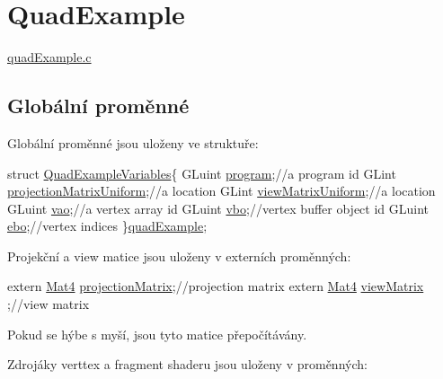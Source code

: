 \hypertarget{QuadExample-example}{\section{Quad\-Example}
}
\hyperlink{quadExample_8c}{quad\-Example.\-c}  \hypertarget{quadExample.c_Globals}{}\subsection{Globální proměnné}\label{quadExample.c_Globals}
Globální proměnné jsou uloženy ve struktuře\-: 
\begin{DoxyCodeInclude}

\textcolor{keyword}{struct }\hyperlink{structQuadExampleVariables}{QuadExampleVariables}\{
  GLuint \hyperlink{structQuadExampleVariables_a63971781ff860bd201886926f943ba78}{program};\textcolor{comment}{//a program id}
\textcolor{comment}{}  GLint  \hyperlink{structQuadExampleVariables_a38a1023cb8ee3692e195ea574e43c51a}{projectionMatrixUniform};\textcolor{comment}{//a location}
\textcolor{comment}{}  GLint  \hyperlink{structQuadExampleVariables_a9c505e0a089ecd495b18550309ebab77}{viewMatrixUniform};\textcolor{comment}{//a location}
\textcolor{comment}{}  GLuint \hyperlink{structQuadExampleVariables_a294c388653d62435d7eeb7994f45c4fc}{vao};\textcolor{comment}{//a vertex array id}
\textcolor{comment}{}  GLuint \hyperlink{structQuadExampleVariables_a69515fd546272c117e14f784221f6412}{vbo};\textcolor{comment}{//vertex buffer object id}
\textcolor{comment}{}  GLuint \hyperlink{structQuadExampleVariables_a3b1abdb0f18593a0ebec8dd9a222164b}{ebo};\textcolor{comment}{//vertex indices}
\}\hyperlink{quadExample_8c_ad961415145a9c30bd9846d4a278cc63a}{quadExample};
\end{DoxyCodeInclude}
Projekční a view matice jsou uloženy v externích proměnných\-: 
\begin{DoxyCodeInclude}
\textcolor{keyword}{extern} \hyperlink{structMat4}{Mat4} \hyperlink{mouseCamera_8c_a1f344d924f733a22d7659db612a0efe8}{projectionMatrix};\textcolor{comment}{//projection matrix}
\textcolor{comment}{}\textcolor{keyword}{extern} \hyperlink{structMat4}{Mat4} \hyperlink{mouseCamera_8c_ae64ebe4c77936fc93d161b97bd8e96df}{viewMatrix}      ;\textcolor{comment}{//view matrix}
\end{DoxyCodeInclude}
Pokud se hýbe s myší, jsou tyto matice přepočítávány.\par
 Zdrojáky verttex a fragment shaderu jsou uloženy v proměnných\-: 
